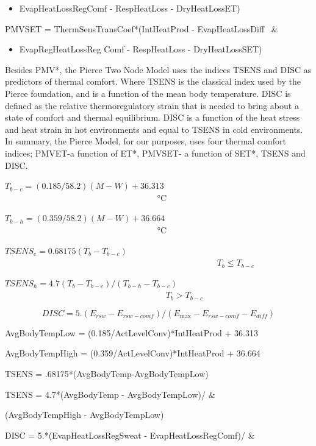 \begin{itemize}
\tightlist
\item
  EvapHeatLossRegComf - RespHeatLoss - DryHeatLossET)
\end{itemize}

PMVSET = ThermSensTransCoef*(IntHeatProd - EvapHeatLossDiff~ \&

\begin{itemize}
\tightlist
\item
  EvapRegHeatLossReg Comf - RespHeatLoss - DryHeatLossSET)
\end{itemize}

Besides PMV*, the Pierce Two Node Model uses the indices TSENS and DISC as predictors of thermal comfort. Where TSENS is the classical index used by the Pierce foundation, and is a function of the mean body temperature. DISC is defined as the relative thermoregulatory strain that is needed to bring about a state of comfort and thermal equilibrium. DISC is a function of the heat stress and heat strain in hot environments and equal to TSENS in cold environments. In summary, the Pierce Model, for our purposes, uses four thermal comfort indices; PMVET-a function of ET*, PMVSET- a function of SET*, TSENS and DISC.

\({T_{b - c}} = (0.185/58.2)(M - W) + 36.313\) ~~~~~~~~~~~~~~~~~~~~~~~~~~~~~~~~~~~ °C

\({T_{b - h}} = (0.359/58.2)(M - W) + 36.664\) ~~~~~~~~~~~~~~~~~~~~~~~~~~~~~~~~~~~ °C

\(TSEN{S_c} = 0.68175({T_b} - {T_{b - c}})\) ~~~~~~~~~~~~~~~~~~~~~~~~~~~~~~~~~~~~~~~~~~~~~~~~~ \({T_b} \le {T_{b - c}}\)

\(TSEN{S_h} = 4.7({T_b} - {T_{b - c}})/({T_{b - h}} - {T_{b - c}})\) ~~~~~~~~~~~~~~~~~~~~~~~~~~~~~~~~~~~~~ \({T_b} > {T_{b - c}}\)

\begin{equation}
DISC = 5.({E_{rsw}} - {E_{rsw - comf}})/({E_{\max }} - {E_{rsw - comf}} - {E_{diff}})
\end{equation}

AvgBodyTempLow = (0.185/ActLevelConv)*IntHeatProd + 36.313

AvgBodyTempHigh = (0.359/ActLevelConv)*IntHeatProd + 36.664

TSENS = .68175*(AvgBodyTemp-AvgBodyTempLow)

TSENS = 4.7*(AvgBodyTemp - AvgBodyTempLow)/ \&

(AvgBodyTempHigh - AvgBodyTempLow)

DISC = 5.*(EvapHeatLossRegSweat - EvapHeatLossRegComf)/ \&

